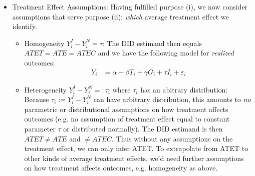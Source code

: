 \documentclass[12pt]{article}
\theoremstyle{plain}
\theoremstyle{definition}
\theoremstyle{remark}
\begin{document}
\begin{itemize}
\begin{itemize}
\begin{itemize}
          \item Mean independence \citep{abadie2005}:
            $\E[\varepsilon_i|G_i,T_i]=0$.\footnote{%
              As usual in regressions settings, the fact that the
              expectation has \emph{value zero in particular} is the wlog
              part.
              The real content of the assumption is constancy of this
              expectation.
            }
            This allows for heteroskedasticity in the distribution of
            $\varepsilon_i$ across values of $G_i$ and $T_i$.
            It implies that changes in time of moments of the outcomes
            other than the mean are not relevant for predicting the mean
            of $Y_i^N$.

            Note one complication here:
            Mean-independence is generally not invariant to
            scaling/units.
            If we assume mean independence in levels then take logs, we
            might not have mean independence for log-levels.

          \item Zero correlation:
            $\E[\varepsilon_iG_i]=\E[\varepsilon_iT_i]=0$.
            Also allows for heteroskedasticity.
        \end{itemize}

      \item Treatment Effect Assumptions:
        Having fulfilled purpose (i), we now consider assumptions that serve
        purpose (ii): \emph{which} average treatment effect we identify.
        \begin{itemize}
          \item Homogeneity $Y_i^I-Y_i^N=\tau$:
            The DID estimand then equals $ATET=ATE=ATEC$ and we have the
            following model for \emph{realized} outcomes:
            \begin{align*}
              Y_i &= \alpha + \beta T_i + \gamma G_i + \tau I_i + \varepsilon_i
            \end{align*}

          \item Heterogeneity $Y_i^I-Y_i^N=:\tau_i$ where $\tau_i$ has an
            abitrary distribution:
            Because $\tau_i:=Y_i^I-Y_i^N$ can have arbitrary distribution,
            this amounts to \emph{no} parametric or distributional
            assumptions on how treatment affects outcomes (e.g. no
            assumption of treatment effect equal to constant parameter
            $\tau$ or distributed normally).
            The DID estimand is then $ATET\neq ATE$ and $\neq ATEC$.
            Thus without any assumptions on the treatment effect, we can
            only infer ATET.
            To extrapolate from ATET to other kinds of average treatment
            effects, we'd need further assumptions on how treatment affects
            outcomes, e.g. homogeneity as above.
        \end{itemize}
    \end{itemize}


\end{itemize}
\end{document}

